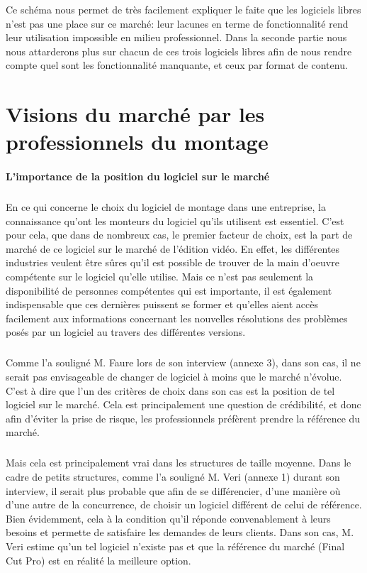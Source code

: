 Ce schéma nous permet de très facilement expliquer le faite que les
logiciels libres n'est pas une place sur ce marché: leur lacunes en
terme de fonctionnalité rend leur utilisation impossible en milieu
professionnel. Dans la seconde partie nous nous attarderons plus sur
chacun de ces trois logiciels libres afin de nous rendre compte quel
sont les fonctionnalité manquante, et ceux par format de contenu.


\newpage

\section{Visions du marché par les professionnels du montage}

\paragraph{L'importance de la position du logiciel sur le marché}

\subparagraph{} En ce qui concerne le choix du logiciel de montage dans
une entreprise, la connaissance qu'ont les monteurs du logiciel qu'ils
utilisent est essentiel.  C'est pour cela, que dans de nombreux cas,
le premier facteur de choix, est la part de marché de ce logiciel
sur le marché de l'édition vidéo. En effet, les différentes
industries veulent être sûres qu'il est possible de trouver de la
main d'oeuvre compétente sur le logiciel qu'elle utilise.  Mais ce
n'est pas seulement la disponibilité de personnes compétentes qui
est importante, il est également indispensable que ces dernières
puissent se former et qu'elles aient accès facilement aux informations
concernant les nouvelles résolutions des problèmes posés par un
logiciel au travers des différentes versions.

\subparagraph{} Comme l'a souligné M. Faure lors de son interview
(annexe 3), dans son cas, il ne serait pas envisageable de changer de
logiciel à moins que le marché n'évolue. C'est à dire que l'un des
critères de choix dans son cas est la position de tel logiciel sur
le marché. Cela est principalement une question de crédibilité, et
donc afin d'éviter la prise de risque, les professionnels préfèrent
prendre la référence du marché.

\subparagraph{}

Mais cela est principalement vrai dans les structures de taille moyenne.
Dans le cadre de petits structures, comme l'a souligné M. Veri
(annexe 1) durant son interview, il serait plus probable que afin de
se différencier, d'une manière où d'une autre de la concurrence,
de choisir un logiciel différent de celui de référence. Bien
évidemment, cela à la condition qu'il réponde convenablement
à leurs besoins et permette de satisfaire les demandes de leurs
clients. Dans son cas, M. Veri estime qu'un tel logiciel n'existe pas
et que la référence du marché (Final Cut Pro) est en réalité la
meilleure option.

